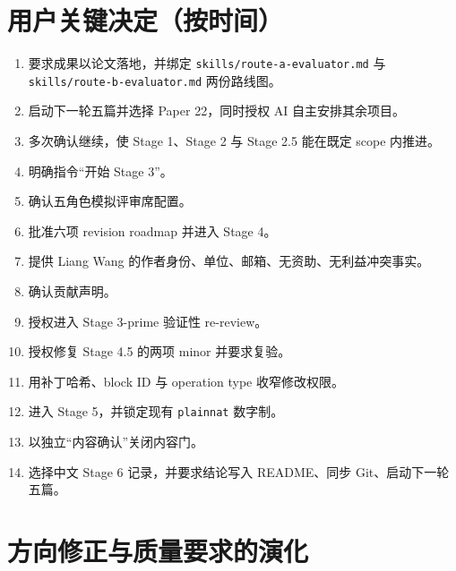 \documentclass[12pt,a4paper]{article}
\providecommand{\tightlist}{\setlength{\itemsep}{0pt}\setlength{\parskip}{0pt}}
\begin{document}
\hypertarget{ux7528ux6237ux5173ux952eux51b3ux5b9aux6309ux65f6ux95f4}{%
\section{用户关键决定（按时间）}\label{ux7528ux6237ux5173ux952eux51b3ux5b9aux6309ux65f6ux95f4}}

\begin{enumerate}
\def\labelenumi{\arabic{enumi}.}
\tightlist
\item
  要求成果以论文落地，并绑定 \texttt{skills/route-a-evaluator.md} 与
  \texttt{skills/route-b-evaluator.md} 两份路线图。
\item
  启动下一轮五篇并选择 Paper 22，同时授权 AI 自主安排其余项目。
\item
  多次确认继续，使 Stage 1、Stage 2 与 Stage 2.5 能在既定 scope 内推进。
\item
  明确指令``开始 Stage 3''。
\item
  确认五角色模拟评审席配置。
\item
  批准六项 revision roadmap 并进入 Stage 4。
\item
  提供 Liang Wang 的作者身份、单位、邮箱、无资助、无利益冲突事实。
\item
  确认贡献声明。
\item
  授权进入 Stage 3-prime 验证性 re-review。
\item
  授权修复 Stage 4.5 的两项 minor 并要求复验。
\item
  用补丁哈希、block ID 与 operation type 收窄修改权限。
\item
  进入 Stage 5，并锁定现有 \texttt{plainnat} 数字制。
\item
  以独立``内容确认''关闭内容门。
\item
  选择中文 Stage 6 记录，并要求结论写入 README、同步
  Git、启动下一轮五篇。
\end{enumerate}

\hypertarget{ux65b9ux5411ux4feeux6b63ux4e0eux8d28ux91cfux8981ux6c42ux7684ux6f14ux5316}{%
\section{方向修正与质量要求的演化}\label{ux65b9ux5411ux4feeux6b63ux4e0eux8d28ux91cfux8981ux6c42ux7684ux6f14ux5316}}
\end{document}
